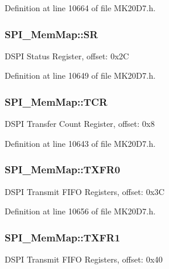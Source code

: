 Definition at line 10664 of file M\+K20\+D7.\+h.

\subsubsection[{\texorpdfstring{SR}{SR}}]{ S\+P\+I\+\_\+\+Mem\+Map\+::\+SR}\hypertarget{struct_s_p_i___mem_map_a1cd4975403798b364632d0e9af310962}{}\label{struct_s_p_i___mem_map_a1cd4975403798b364632d0e9af310962}
D\+S\+PI Status Register, offset\+: 0x2C 

Definition at line 10649 of file M\+K20\+D7.\+h.

\subsubsection[{\texorpdfstring{T\+CR}{TCR}}]{ S\+P\+I\+\_\+\+Mem\+Map\+::\+T\+CR}\hypertarget{struct_s_p_i___mem_map_ab92eb6630f7fe6309c605f0155c3a4c9}{}\label{struct_s_p_i___mem_map_ab92eb6630f7fe6309c605f0155c3a4c9}
D\+S\+PI Transfer Count Register, offset\+: 0x8 

Definition at line 10643 of file M\+K20\+D7.\+h.

\subsubsection[{\texorpdfstring{T\+X\+F\+R0}{TXFR0}}]{ S\+P\+I\+\_\+\+Mem\+Map\+::\+T\+X\+F\+R0}\hypertarget{struct_s_p_i___mem_map_aa234b528e26469e3bafea1dfecff1dfe}{}\label{struct_s_p_i___mem_map_aa234b528e26469e3bafea1dfecff1dfe}
D\+S\+PI Transmit F\+I\+FO Registers, offset\+: 0x3C 

Definition at line 10656 of file M\+K20\+D7.\+h.

\subsubsection[{\texorpdfstring{T\+X\+F\+R1}{TXFR1}}]{ S\+P\+I\+\_\+\+Mem\+Map\+::\+T\+X\+F\+R1}\hypertarget{struct_s_p_i___mem_map_aa4c8bc4c6c43cb03d266084ead4948f6}{}\label{struct_s_p_i___mem_map_aa4c8bc4c6c43cb03d266084ead4948f6}
D\+S\+PI Transmit F\+I\+FO Registers, offset\+: 0x40 

